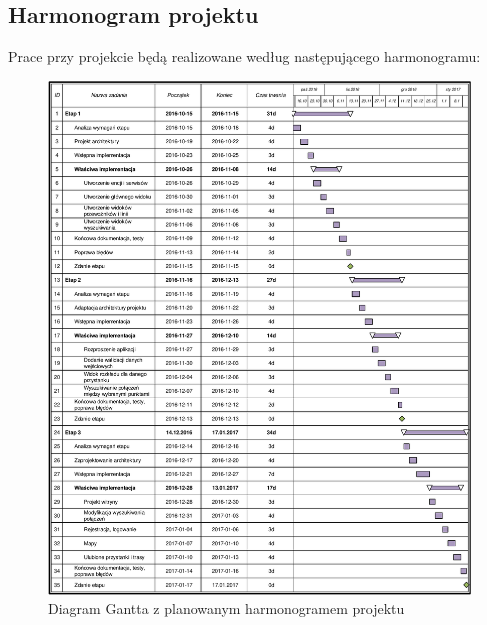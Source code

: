 \documentclass[10pt,a4paper]{article}
\begin{document}
\newpage
\subsection{Harmonogram projektu}
Prace przy projekcie będą realizowane według następującego harmonogramu:
\begin{figure}[H]
	\centering
	\includegraphics[width=15.5cm]{Resources/PDF/gantt.pdf}
	\caption{Diagram Gantta z planowanym harmonogramem projektu}
\end{figure}
\end{document}
